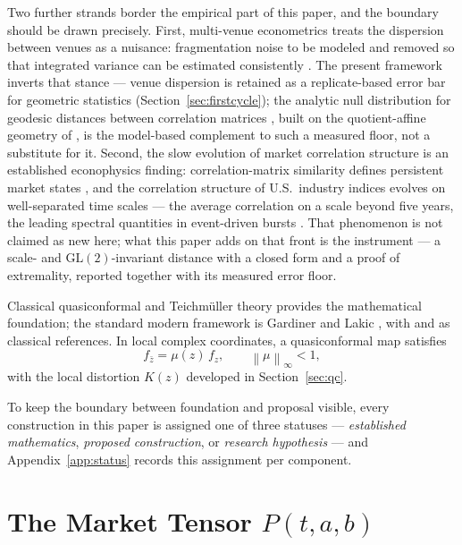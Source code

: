 \documentclass[11pt,a4paper]{article}
\numberwithin{equation}{section}
\newcommand{\norm}[1]{\left\lVert#1\right\rVert}
\begin{document}
Two further strands border the empirical part of this paper, and
the boundary should be drawn precisely. First, multi-venue
econometrics treats the dispersion between venues as a nuisance:
fragmentation noise to be modeled and removed so that integrated
variance can be estimated consistently \cite{DiasSchweikert2026}.
The present framework inverts that stance --- venue dispersion is
retained as a replicate-based error bar for geometric statistics
(Section~\ref{sec:firstcycle}); the analytic null distribution for
geodesic distances between correlation matrices
\cite{Kuketayev2026}, built on the quotient-affine geometry of
\cite{ThanwerdasPennec2021}, is the model-based complement to such
a measured floor, not a substitute for it. Second, the slow
evolution of market correlation structure is an established
econophysics finding: correlation-matrix similarity defines
persistent market states \cite{Muennix2012}, and the correlation
structure of U.S.\ industry indices evolves on well-separated
time scales --- the average correlation on a scale beyond five
years, the leading spectral quantities in event-driven bursts
\cite{BuccheriMarmiMantegna2013}. That phenomenon is not claimed
as new here; what this paper adds on that front is the
instrument --- a scale- and $\mathrm{GL}(2)$-invariant distance
with a closed form and a proof of extremality, reported together
with its measured error floor.

Classical quasiconformal and Teichmüller theory provides the
mathematical foundation; the standard modern framework is Gardiner
and Lakic \cite{GardinerLakic2000}, with \cite{Ahlfors1966} and
\cite{AstalaIwaniecMartin} as classical references. In local complex
coordinates, a quasiconformal map satisfies
\begin{equation}
f_{\bar z}=\mu(z)\,f_z,\qquad\norm{\mu}_\infty<1,
\end{equation}
with the local distortion $K(z)$ developed in
Section~\ref{sec:qc}.

To keep the boundary between foundation and proposal visible, every
construction in this paper is assigned one of three statuses ---
\emph{established mathematics}, \emph{proposed construction}, or
\emph{research hypothesis} --- and Appendix~\ref{app:status} records
this assignment per component.

\section{The Market Tensor \texorpdfstring{$P(t,a,b)$}{P(t,a,b)}}
\end{document}
